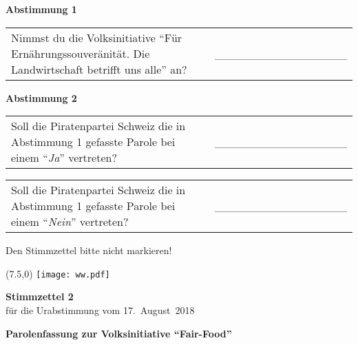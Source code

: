 \documentclass[11pt, a4paper]{scrartcl}
\newcommand{\votingdate}{17.~August~2018}
\newcommand{\ja}{\enquote{\textit{Ja}}}
\newcommand{\nein}{\enquote{\textit{Nein}}}
\begin{document}
{\begin{minipage}[t][12.5cm][t]{17.7cm}
\vspace{1cm}

\textbf{Abstimmung 1}

\vspace{0.5cm}

\begin{tabular}{ b{13.5cm} b{3cm} }
Nimmst du die Volksinitiative \enquote{Für Ernährungssouveränität. Die Landwirtschaft betrifft uns alle} an?
& \_\_\_\_\_\_\_\_\_\_\_\_\_\_\_\_ \\
\end{tabular}

\vspace{0.5cm}

\textbf{Abstimmung 2}

\vspace{0.5cm}

\begin{tabular}{ b{13.5cm} b{3cm} }
Soll die Piratenpartei Schweiz die in Abstimmung 1 gefasste Parole bei einem \ja{} vertreten?
& \_\_\_\_\_\_\_\_\_\_\_\_\_\_\_\_ \\
\end{tabular}

\vspace{0.5cm}

\begin{tabular}{ b{13.5cm} b{3cm} }
Soll die Piratenpartei Schweiz die in Abstimmung 1 gefasste Parole bei einem \nein{} vertreten? 
& \_\_\_\_\_\_\_\_\_\_\_\_\_\_\_\_ \\
\end{tabular}

\vspace{0.5cm}

Den Stimmzettel bitte nicht markieren!

\end{minipage}

\newpage

\begin{minipage}[t][12.5cm][t]{17.7cm}

\begin{textblock}{6}(7.5,0)
\texttt{[image: ww.pdf]}
\end{textblock}

{\LARGE\textbf{Stimmzettel 2}} \\
für die Urabstimmung vom \votingdate{} \\

\vspace{2cm}

\textbf{Parolenfassung zur Volksinitiative \enquote{Fair-Food}}


\end{minipage}}
\end{document}
